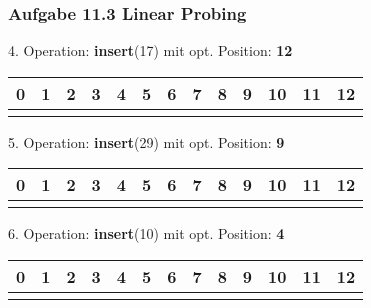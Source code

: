 \documentclass{beamer}
\begin{document}
\begin{frame}
	\frametitle{Aufgabe 11.3 Linear Probing}
	4. Operation: \textbf{insert}(17) mit opt. Position: \textbf{12}
	\begin{table}
		\centering
		\begin{tabular}{c|c|c|c|c|c|c|c|c|c|c|c|c}
			0 & 1 & 2 & 3 & 4 & 5 & 6 & 7 & 8 & 9 & 10 & 11 & 12 \\
			\hline
			  &   &   &   &   &   &   &   &   &   &    &    &    \\
		\end{tabular}
	\end{table}

	5. Operation: \textbf{insert}(29) mit opt. Position: \textbf{9}
	\begin{table}
		\centering
		\begin{tabular}{c|c|c|c|c|c|c|c|c|c|c|c|c}
			0 & 1 & 2 & 3 & 4 & 5 & 6 & 7 & 8 & 9 & 10 & 11 & 12 \\
			\hline
			  &   &   &   &   &   &   &   &   &   &    &    &    \\
		\end{tabular}
	\end{table}

	6. Operation: \textbf{insert}(10) mit opt. Position: \textbf{4}
	\begin{table}
		\centering
		\begin{tabular}{c|c|c|c|c|c|c|c|c|c|c|c|c}
			0 & 1 & 2 & 3 & 4 & 5 & 6 & 7 & 8 & 9 & 10 & 11 & 12 \\
			\hline
			  &   &   &   &   &   &   &   &   &   &    &    &    \\
		\end{tabular}
	\end{table}
\end{frame}
\end{document}
